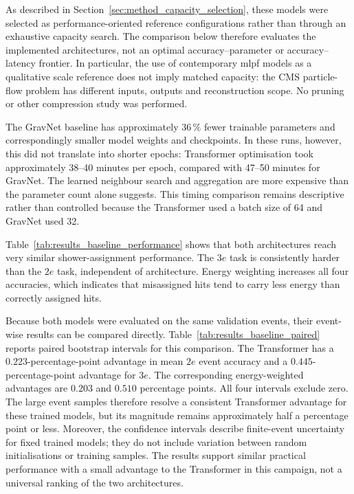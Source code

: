 

As described in Section~\ref{sec:method_capacity_selection}, these models were
selected as performance-oriented reference configurations rather than through
an exhaustive capacity search. The comparison below therefore evaluates the
implemented architectures, not an optimal accuracy--parameter or
accuracy--latency frontier. In particular, the use of contemporary \gls{mlpf}
models as a qualitative scale reference does not imply matched capacity: the
CMS particle-flow problem has different inputs, outputs and reconstruction
scope. No pruning or other compression study was performed.


The GravNet baseline has approximately \(36\,\%\) fewer trainable parameters
and correspondingly smaller model weights and checkpoints. In these runs,
however, this did not translate into shorter epochs: Transformer optimisation
took approximately 38--40 minutes per epoch, compared with 47--50 minutes for
GravNet. The learned neighbour search and aggregation are more expensive than
the parameter count alone suggests. This timing comparison remains
descriptive rather than controlled because the Transformer used a batch size
of 64 and GravNet used 32.

Table~\ref{tab:results_baseline_performance} shows that both architectures
reach very similar shower-assignment performance. The \(3e\) task is
consistently harder than the \(2e\) task, independent of architecture. Energy
weighting increases all four accuracies, which indicates that misassigned
hits tend to carry less energy than correctly assigned hits.



Because both models were evaluated on the same validation events, their
event-wise results can be compared directly. Table~\ref{tab:results_baseline_paired}
reports paired bootstrap intervals for this comparison. The Transformer has a
\(0.223\)-percentage-point advantage in mean \(2e\) event accuracy and a
\(0.445\)-percentage-point advantage for \(3e\). The corresponding
energy-weighted advantages are \(0.203\) and \(0.510\) percentage points. All
four intervals exclude zero. The large event samples therefore resolve a
consistent Transformer advantage for these trained models, but its magnitude
remains approximately half a percentage point or less. Moreover, the
confidence intervals describe finite-event uncertainty for fixed trained
models; they do not include variation between random initialisations or
training samples. The results support similar practical performance with a
small advantage to the Transformer in this campaign, not a universal ranking
of the two architectures.

